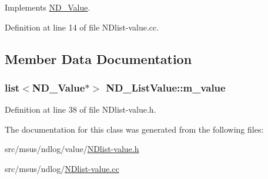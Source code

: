Implements \hyperlink{class_n_d___value_a7660a0e6c07a198410fc05725d903219}{N\-D\-\_\-\-Value}.



Definition at line 14 of file N\-Dlist-\/value.\-cc.



\subsection{Member Data Documentation}
\hypertarget{class_n_d___list_value_aacc3eedd7f24327d7ab07c31b7e35a01}{
\subsubsection[{m\-\_\-value}]{\setlength{\rightskip}{0pt plus 5cm}list$<${\bf N\-D\-\_\-\-Value}$\ast$$>$ N\-D\-\_\-\-List\-Value\-::m\-\_\-value\hspace{0.3cm}{\ttfamily [protected]}}}\label{class_n_d___list_value_aacc3eedd7f24327d7ab07c31b7e35a01}


Definition at line 38 of file N\-Dlist-\/value.\-h.



The documentation for this class was generated from the following files\-:\begin{DoxyCompactItemize}
\item 
src/msus/ndlog/value/\hyperlink{_n_dlist-value_8h}{N\-Dlist-\/value.\-h}\item 
src/msus/ndlog/\hyperlink{_n_dlist-value_8cc}{N\-Dlist-\/value.\-cc}\end{DoxyCompactItemize}
